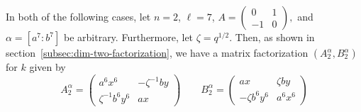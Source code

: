 \documentclass [11pt, proquest] {uwthesis}[2020/02/24]
\begin{document}
    In both of the following cases, let $n=2$, $\ell=7$, $A=(\begin{smallmatrix}0&1\\-1&0\end{smallmatrix}),$ and $\alpha=[a^7:b^7]$ be arbitrary. Furthermore, let $\zeta=q^{1/2}.$ Then, as shown in section~\ref{subsec:dim-two-factorization}, we have a matrix factorization $(A_2^\alpha,B_2^\alpha)$ for $k$ given by
    \[A_2^\alpha=
    \begin{pmatrix}
        a^6x^6 & -\zeta^{-1}by\\ 
        \zeta^{-1} b^6y^6 & ax
    \end{pmatrix}\qquad B_2^\alpha=
    \begin{pmatrix}
        ax & \zeta by\\ 
        -\zeta b^6y^{6} & a^6 x^{6}
    \end{pmatrix}\]
    
\end{document}
